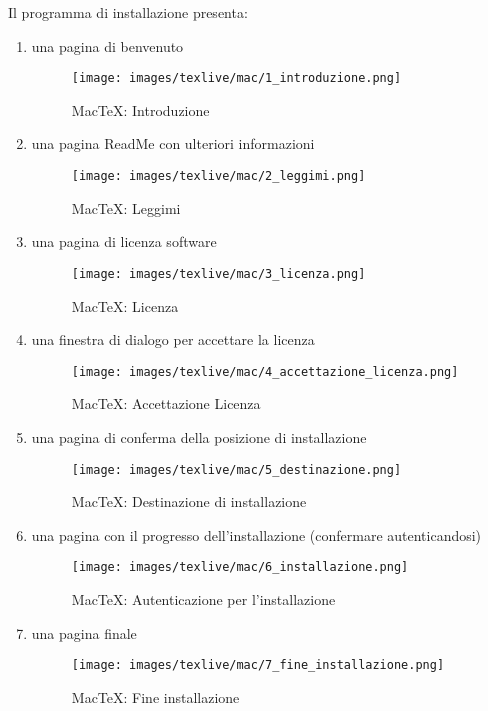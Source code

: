 \documentclass[envcountsame,envcountchap]{svmono}
\begin{document}
Il programma di installazione presenta:
\label{esempio_elenco_numerato}
\begin{enumerate}
    \item una pagina di benvenuto
        \begin{figure}[H]
            \centering
            \texttt{[image: images/texlive/mac/1\_introduzione.png]}
            \caption{MacTeX: Introduzione}
            \label{mactex_introduzione}
        \end{figure}
    \item una pagina ReadMe con ulteriori informazioni
        \begin{figure}[H]
            \centering
            \texttt{[image: images/texlive/mac/2\_leggimi.png]}
            \caption{MacTeX: Leggimi}
            \label{mactex_readme}
        \end{figure}
    \item una pagina di licenza software
        \begin{figure}[H]
            \centering
            \texttt{[image: images/texlive/mac/3\_licenza.png]}
            \caption{MacTeX: Licenza}
            \label{mactex_licenza}
        \end{figure}
    \item una finestra di dialogo per accettare la licenza
        \begin{figure}[H]
            \centering
            \texttt{[image: images/texlive/mac/4\_accettazione\_licenza.png]}
            \caption{MacTeX: Accettazione Licenza}
            \label{mactex_acc_licenza}
        \end{figure}
    \item una pagina di conferma della posizione di installazione
        \begin{figure}[H]
            \centering
            \texttt{[image: images/texlive/mac/5\_destinazione.png]}
            \caption{MacTeX: Destinazione di installazione}
            \label{mactex_dest_installazione}
        \end{figure}
    \item una pagina con il progresso dell'installazione (confermare autenticandosi)
        \begin{figure}[H]
            \centering
            \texttt{[image: images/texlive/mac/6\_installazione.png]}
            \caption{MacTeX: Autenticazione per l'installazione}
            \label{mactex_install_auth}
        \end{figure}
    \item una pagina finale
        \begin{figure}[H]
            \centering
            \texttt{[image: images/texlive/mac/7\_fine\_installazione.png]}
            \caption{MacTeX: Fine installazione}
            \label{mactex_fine_inst}
        \end{figure}
\end{enumerate}
\end{document}
